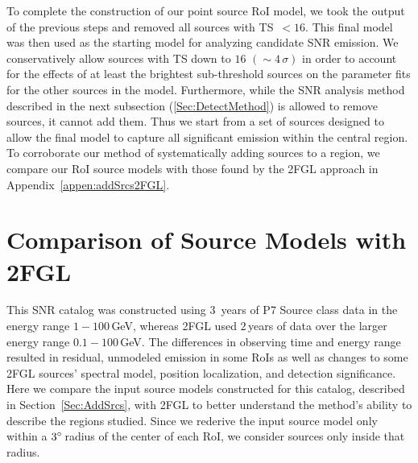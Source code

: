 {%

To complete the construction of our point source RoI model, we took the output of the previous steps and removed all sources with TS~$< 16$. This final model was then used as the starting model for analyzing candidate SNR emission. We conservatively allow sources with TS down to $16$ $(\sim4\,\sigma)$ in order to account for the effects of at least the brightest sub-threshold sources on the parameter fits for the other sources in the model. Furthermore, while the SNR analysis method described in the next subsection (\ref{Sec:DetectMethod}) is allowed to remove sources, it cannot add them. Thus we start from a set of sources designed to allow the final model to capture all significant emission within the central region. To corroborate our method of systematically adding sources to a region, we compare our RoI source models with those found by the 2FGL approach in Appendix~\ref{appen:addSrcs2FGL}. 


\section{Comparison of Source Models with 2FGL}
\label{snrcat:addSrcs2FGL}

This SNR catalog was constructed using $3$~years of P7 Source class data in the energy range $1-100$\,GeV, whereas 2FGL used $2$\,years of data over the larger energy range $0.1-100$\,GeV. The differences in observing time and energy range resulted in residual, unmodeled emission in some RoIs as well as changes to some 2FGL sources' spectral model, position localization, and detection significance. Here we compare the input source models constructed for this catalog, described in Section~\ref{Sec:AddSrcs}, with 2FGL to better understand the method's ability to describe the regions studied. Since we rederive the input source model only within a $3\mbox{$^\circ$}$\,radius of the center of each RoI, 
we consider sources only inside that radius.

}
